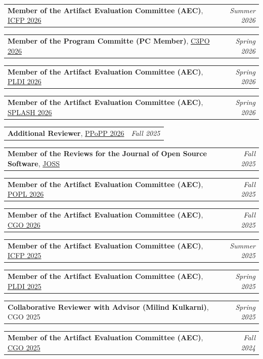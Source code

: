 \documentclass[a4paper,11pt]{article}
\makeatletter
\newcommand{\resumePOR}[3]{
\vspace{0.5mm}\item
    \begin{tabular*}{0.97\textwidth}[t]{l@{\extracolsep{\fill}}r}
        \textbf{#1}\hspace{0.3mm}#2 & \textit{\small{#3}} 
    \end{tabular*}
    \vspace{-2mm}
}
\makeatother
\begin{document}
\resumePOR
  {Member of the Artifact Evaluation Committee (AEC)}
  {, \href{https://icfp26.sigplan.org/committee/icfp-2026-artifact-evaluation-organization-committee}{ICFP 2026}}
  {Summer 2026}

\resumePOR
  {Member of the Program Committe (PC Member)}
  {, \href{https://c3po-workshop.github.io/2026/organization}{C3PO 2026}}
  {Spring 2026}

\resumePOR
  {Member of the Artifact Evaluation Committee (AEC)}
  {, \href{https://pldi26.sigplan.org/committee/pldi-2026-pldi-research-artifacts-artifact-evaluation-committee}{PLDI 2026}}
  {Spring 2026}

\resumePOR
  {Member of the Artifact Evaluation Committee (AEC)}
  {, \href{https://2026.splashcon.org/committee/splash-2026-artifact-evaluation-artifact-evaluation-committee}{SPLASH 2026}}
  {Spring 2026}

\resumePOR
  {Additional Reviewer}
  {, \href{https://dl.acm.org/doi/pdf/10.1145/3774934}{PPoPP 2026}}
  {Fall 2025}

\resumePOR
  {Member of the Reviews for the Journal of Open Source Software}
  {, \href{https://github.com/openjournals/joss-reviews?tab=readme-ov-file}{JOSS}}
  {Fall 2025}

\resumePOR
  {Member of the Artifact Evaluation Committee (AEC)}
  {, \href{https://popl26.sigplan.org/track/POPL-2026-artifact-evaluation}{POPL 2026}}
  {Fall 2025}

\resumePOR
  {Member of the Artifact Evaluation Committee (AEC)}
  {, \href{https://2025.cgo.org/committee/cgo-2025-artifact-evaluation-artifact-evaluation-committee}{CGO 2026}}
  {Fall 2025}

\resumePOR
  {Member of the Artifact Evaluation Committee (AEC)}
  {, \href{https://icfp25.sigplan.org/committee/icfp-2025-artifact-evaluation-artifact-evaluation-committe}{ICFP 2025}}
  {Summer 2025}

\resumePOR
  {Member of the Artifact Evaluation Committee (AEC)}
  {, \href{https://pldi25.sigplan.org/committee/pldi-2025-pldi-research-artifacts-artifact-evaluation-committee}{PLDI 2025}}
  {Spring 2025}

\resumePOR
  {Collaborative Reviewer with Advisor (Milind Kulkarni)}
  {, CGO 2025}
  {Spring 2025}
  
\resumePOR
  {Member of the Artifact Evaluation Committee (AEC)}
  {, \href{https://2025.cgo.org/committee/cgo-2025-artifact-evaluation-artifact-evaluation-committee}{CGO 2025}}
  {Fall 2024}
  
\end{document}
